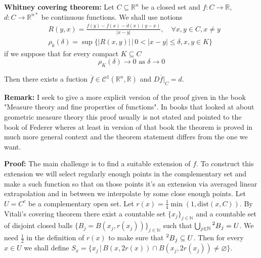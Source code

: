 \documentclass{article}
\begin{document}
\vspace{1ex}
\textbf{Whitney covering theorem:}
Let $C\subseteq \mathbb{R}^n$ be a closed set and $f:C\rightarrow\mathbb R$,
$d:C\rightarrow\mathbb{R}^{n*}$ be continuous functions. We shall use notions
\[
\begin{aligned}
    &R(y,x)=\frac{f(y)-f(x)-d(x)(y-x)}{|x-y|},\quad\forall x,y\in C, x\neq y \\
    &\rho_k(\delta)=\sup\{|R(x,y)|\, |\, 0<|x-y|\leq\delta, x, y\in K\}
\end{aligned}
\]
if we suppose that for every compact $K\subseteq C$
\begin{equation}
\rho_K(\delta)\rightarrow 0\text{ as }\delta\rightarrow 0
\end{equation}

Then there exists a fuction $\overline f\in\mathcal{C}^1(\mathbb{R}^n,\mathbb{R})$
and $D\overline f|_C=d$.

\vspace{1ex}
\textbf{Remark:}
I seek to give a more explicit version of the proof given in the book "Measure
theory and fine properties of functions". In books that looked at about
geometric measure theory this proof usually is not stated and pointed to the
book of Federer wheres at least in version of that book the theorem is proved
in much more general context and the theorem statement differs from the one we
want.

\vspace{1ex}
\textbf{Proof:}
The main challenge is to find a suitable extension of $f$. To construct this
extension we will select regularly enough points in the complementary set and
make a such function so that on those points it's an extension via averaged linear extrapolation and in
between we interpolate by some close enough points. Let $U=C^c$ be a complementary
open set. Let $r(x)=\frac{1}{4}\min(1,\text{dist}(x,C))$.
By Vitali's covering theorem there exist a countable set
$\{x_j\}_{j\in\mathbb{N}}$ and a countable set of disjoint closed balls $\{B_j=B(x_j, r(x_j))\}_
{j\in\mathbb{N}}$ such that $\bigcup_{j\in\mathbb{N}}\prescript{2}{}B_j=U$. We
need $\frac{1}{2}$ in the definition of $r(x)$ to make sure that $\prescript{2}{}
B_j\subseteq U$. Then for every $x\in U$ we shall define $S_x=\{x_j\,|\,B(x,2r(x))
\cap B(x_j,2r(x_j))\neq\varnothing\}$. 
\end{document}

